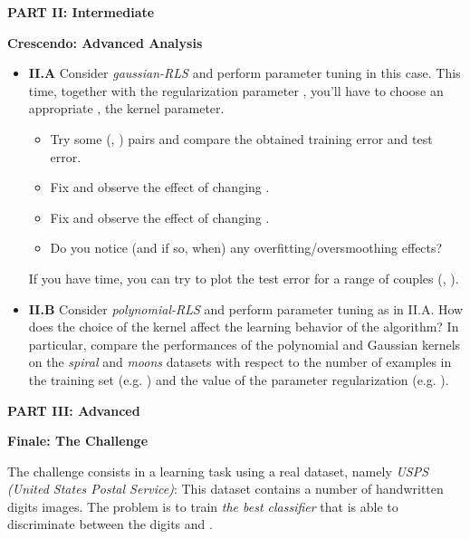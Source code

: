 \documentclass[DIN, pagenumber=false, fontsize=11pt, parskip=half]{scrartcl}
\newcommand{\mysection}[1]{\noindent\large\textbf{#1}}
\begin{document}
\begin{center}
\large\textbf{PART II: Intermediate}
\end{center}

\mysection{Crescendo: Advanced Analysis}

\begin{itemize}
	\item \textbf{II.A} Consider \emph{gaussian-RLS} and perform parameter tuning in this case. This time, together with the regularization parameter , you'll have to choose an appropriate , the kernel parameter.
\begin{itemize}
  \item Try some (, ) pairs and compare the obtained training error  and test error.
  \item Fix  and observe the effect of changing .
  \item Fix  and observe the effect of changing .
  \item Do you notice (and if so, when) any overfitting/oversmoothing effects?
\end{itemize}
  If you have time, you can try to plot the test error for a range of couples (, ).

	\item \textbf{II.B} Consider \emph{polynomial-RLS} and perform parameter tuning as in II.A. How does the choice of the kernel affect the learning behavior of the algorithm? In particular, compare the performances of the polynomial and Gaussian kernels on the \emph{spiral} and \emph{moons} datasets with respect to the number of examples in the training set (e.g. \mcode{[10, 20, 50, 100, 1000]}) and the value of the parameter regularization (e.g. \mcode{[0.5, 0.1, 0.01, 0.001, 0.0001]}).
\end{itemize}



\begin{center}
\large\textbf{PART III: Advanced}
\end{center}

\mysection{Finale: The Challenge}

The challenge consists in a learning task using a real dataset, namely \emph{USPS (United States Postal Service)}: This dataset contains a number of handwritten digits images. The problem is to train \emph{the best classifier} that is able to discriminate between the digits  and .
\end{document}

